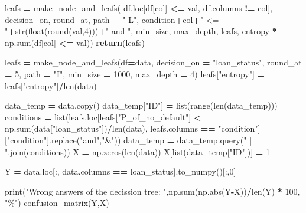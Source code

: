 \documentclass[
]{book}
\newenvironment{Shaded}{\begin{snugshade}}{\end{snugshade}}
\newcommand{\BuiltInTok}[1]{#1}
\newcommand{\ControlFlowTok}[1]{\textcolor[rgb]{0.13,0.29,0.53}{\textbf{#1}}}
\newcommand{\DecValTok}[1]{\textcolor[rgb]{0.00,0.00,0.81}{#1}}
\newcommand{\NormalTok}[1]{#1}
\newcommand{\OperatorTok}[1]{\textcolor[rgb]{0.81,0.36,0.00}{\textbf{#1}}}
\newcommand{\StringTok}[1]{\textcolor[rgb]{0.31,0.60,0.02}{#1}}
\begin{document}
\begin{Shaded}
\begin{Highlighting}[]
\NormalTok{    leafs }\OperatorTok{=}\NormalTok{ make\_node\_and\_leafs( df.loc[df[col] }\OperatorTok{\textless{}=}\NormalTok{ val, df.columns }\OperatorTok{!=}\NormalTok{ col], decision\_on, round\_at, path }\OperatorTok{+} \StringTok{"{-}L"}\NormalTok{, condition}\OperatorTok{+}\NormalTok{col}\OperatorTok{+}\StringTok{" \textless{}= "}\OperatorTok{+}\BuiltInTok{str}\NormalTok{(}\BuiltInTok{float}\NormalTok{(}\BuiltInTok{round}\NormalTok{(val,}\DecValTok{4}\NormalTok{)))}\OperatorTok{+}\StringTok{" and "}\NormalTok{, min\_size, max\_depth, leafs, entropy }\OperatorTok{*}\NormalTok{ np.}\BuiltInTok{sum}\NormalTok{(df[col] }\OperatorTok{\textless{}=}\NormalTok{ val))}
  \ControlFlowTok{return}\NormalTok{(leafs)}
  
  
  


\NormalTok{leafs }\OperatorTok{=}\NormalTok{ make\_node\_and\_leafs(df}\OperatorTok{=}\NormalTok{data, decision\_on }\OperatorTok{=} \StringTok{"loan\_status"}\NormalTok{, round\_at }\OperatorTok{=} \DecValTok{5}\NormalTok{, path }\OperatorTok{=} \StringTok{"I"}\NormalTok{, min\_size }\OperatorTok{=} \DecValTok{1000}\NormalTok{, max\_depth }\OperatorTok{=} \DecValTok{4}\NormalTok{)}
\NormalTok{leafs[}\StringTok{"entropy"}\NormalTok{] }\OperatorTok{=}\NormalTok{ leafs[}\StringTok{"entropy"}\NormalTok{]}\OperatorTok{/}\BuiltInTok{len}\NormalTok{(data)}


\NormalTok{data\_temp }\OperatorTok{=}\NormalTok{ data.copy()}
\NormalTok{data\_temp[}\StringTok{"ID"}\NormalTok{] }\OperatorTok{=} \BuiltInTok{list}\NormalTok{(}\BuiltInTok{range}\NormalTok{(}\BuiltInTok{len}\NormalTok{(data\_temp)))}
\NormalTok{conditions }\OperatorTok{=} \BuiltInTok{list}\NormalTok{(leafs.loc[leafs[}\StringTok{"P\_of\_no\_default"}\NormalTok{] }\OperatorTok{\textless{}}\NormalTok{ np.}\BuiltInTok{sum}\NormalTok{(data[}\StringTok{"loan\_status"}\NormalTok{])}\OperatorTok{/}\BuiltInTok{len}\NormalTok{(data), leafs.columns }\OperatorTok{==} \StringTok{"condition"}\NormalTok{][}\StringTok{"condition"}\NormalTok{].replace(}\StringTok{"and"}\NormalTok{,}\StringTok{"\&"}\NormalTok{))}
\NormalTok{data\_temp }\OperatorTok{=}\NormalTok{ data\_temp.query(}\StringTok{" | "}\NormalTok{.join(conditions))}
\NormalTok{X }\OperatorTok{=}\NormalTok{ np.zeros(}\BuiltInTok{len}\NormalTok{(data))}
\NormalTok{X[}\BuiltInTok{list}\NormalTok{(data\_temp[}\StringTok{"ID"}\NormalTok{])] }\OperatorTok{=} \DecValTok{1}

\NormalTok{Y }\OperatorTok{=}\NormalTok{ data.loc[:, data.columns }\OperatorTok{==} \StringTok{\textquotesingle{}loan\_status\textquotesingle{}}\NormalTok{].to\_numpy()[:,}\DecValTok{0}\NormalTok{]}

\BuiltInTok{print}\NormalTok{(}\StringTok{"Wrong answers of the decission tree: "}\NormalTok{,np.}\BuiltInTok{sum}\NormalTok{(np.}\BuiltInTok{abs}\NormalTok{(Y}\OperatorTok{{-}}\NormalTok{X))}\OperatorTok{/}\BuiltInTok{len}\NormalTok{(Y) }\OperatorTok{*} \DecValTok{100}\NormalTok{, }\StringTok{"\%"}\NormalTok{)}
\NormalTok{confusion\_matrix(Y,X)}
\end{Highlighting}
\end{Shaded}
\end{document}
